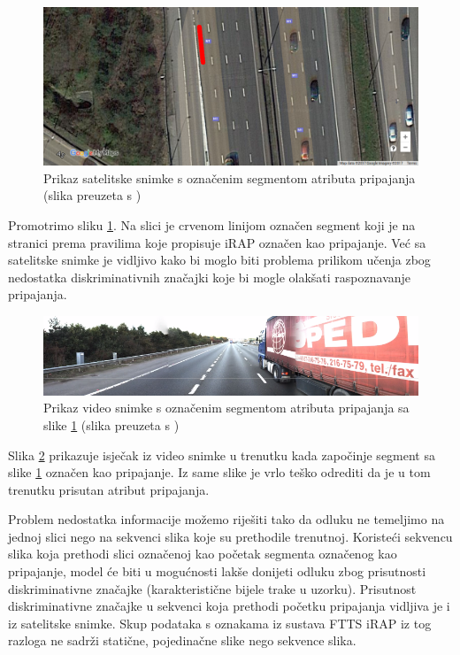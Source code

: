 \documentclass[times, utf8, diplomski, numeric]{fer}
\begin{document}
\begin{figure}[H]
\centering
\includegraphics[scale=0.35]{images/sattelite_merge_lane_irap.png}
\caption{Prikaz satelitske snimke s označenim segmentom atributa pripajanja (slika preuzeta s \citep{url:google_maps})}
\label{img:sattelite_merge_lane_irap}
\end{figure}

Promotrimo sliku \ref{img:sattelite_merge_lane_irap}. Na slici je crvenom linijom označen segment koji je na stranici \citep{url:ftts_irap} prema pravilima koje propisuje iRAP označen kao pripajanje. 
Već sa satelitske snimke je vidljivo kako bi moglo biti problema prilikom učenja zbog nedostatka diskriminativnih značajki koje bi mogle olakšati raspoznavanje pripajanja.

\begin{figure}[H]
\centering
\includegraphics[scale=0.5]{images/video_merge_lane_irap.png}
\caption{Prikaz video snimke s označenim segmentom atributa pripajanja sa slike \ref{img:sattelite_merge_lane_irap} (slika preuzeta s \citep{url:ftts_irap})}
\label{img:video_merge_lane_irap}
\end{figure}

\noindent Slika \ref{img:video_merge_lane_irap} prikazuje isječak iz video snimke u trenutku kada započinje segment sa slike \ref{img:sattelite_merge_lane_irap} označen kao pripajanje. 
Iz same slike je vrlo teško odrediti da je u tom trenutku prisutan atribut pripajanja.

Problem nedostatka informacije možemo riješiti tako da odluku ne temeljimo na jednoj slici nego na sekvenci slika koje su prethodile trenutnoj. 
Koristeći sekvencu slika koja prethodi slici označenoj kao početak segmenta označenog kao pripajanje, model će biti u mogućnosti lakše donijeti odluku zbog prisutnosti diskriminativne značajke (karakteristične bijele trake u uzorku).
Prisutnost diskriminativne značajke u sekvenci koja prethodi početku pripajanja vidljiva je i iz satelitske snimke.
Skup podataka s oznakama iz sustava FTTS iRAP iz tog razloga ne sadrži statične, pojedinačne slike nego sekvence slika.
\end{document}
